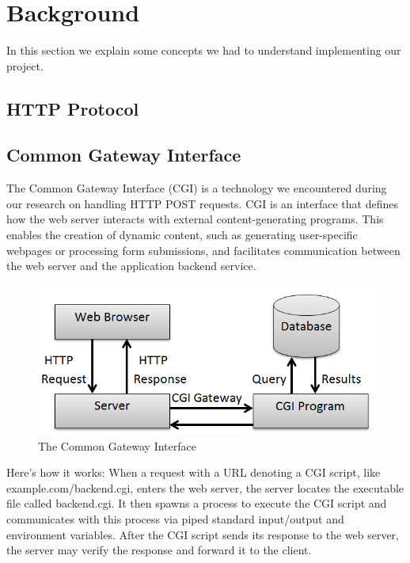 \section*{Background}
In this section we explain some concepts we had to understand implementing our project. 

\subsection*{HTTP Protocol}

\subsection*{Common Gateway Interface}
The Common Gateway Interface (CGI) is a technology we encountered during our research on handling HTTP POST requests. CGI is an interface that defines how the web server interacts with external content-generating programs. This enables the creation of dynamic content, such as generating user-specific webpages or processing form submissions, and facilitates communication between the web server and the application backend service.

\begin{figure}[h]
	\centering
	\includegraphics[width=\textwidth]{figures/Common-Gateway-Interface.png}
	\caption{The Common Gateway Interface}
\end{figure}

Here's how it works: When a request with a URL denoting a CGI script, like example.com/backend.cgi, enters the web server, the server locates the executable file called backend.cgi. It then spawns a process to execute the CGI script and communicates with this process via piped standard input/output and environment variables. After the CGI script sends its response to the web server, the server may verify the response and forward it to the client.\\

